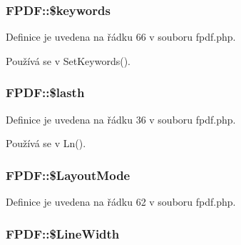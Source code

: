 \hypertarget{class_f_p_d_f_af911783b120fbaaebdad50473826a43a}{
\subsubsection[{\$keywords}]{\setlength{\rightskip}{0pt plus 5cm}F\-P\-D\-F\-::\$keywords}}\label{class_f_p_d_f_af911783b120fbaaebdad50473826a43a}


Definice je uvedena na řádku 66 v souboru fpdf.\-php.



Používá se v Set\-Keywords().

\hypertarget{class_f_p_d_f_a95a0a41b723b698af4b1e4a08e443388}{
\subsubsection[{\$lasth}]{\setlength{\rightskip}{0pt plus 5cm}F\-P\-D\-F\-::\$lasth}}\label{class_f_p_d_f_a95a0a41b723b698af4b1e4a08e443388}


Definice je uvedena na řádku 36 v souboru fpdf.\-php.



Používá se v Ln().

\hypertarget{class_f_p_d_f_a8a1b8f011e83924e04fd4868e6a0fd25}{
\subsubsection[{\$\-Layout\-Mode}]{\setlength{\rightskip}{0pt plus 5cm}F\-P\-D\-F\-::\$\-Layout\-Mode}}\label{class_f_p_d_f_a8a1b8f011e83924e04fd4868e6a0fd25}


Definice je uvedena na řádku 62 v souboru fpdf.\-php.

\hypertarget{class_f_p_d_f_a563f4dec18a06abc382f2e31fe456fe8}{
\subsubsection[{\$\-Line\-Width}]{\setlength{\rightskip}{0pt plus 5cm}F\-P\-D\-F\-::\$\-Line\-Width}}\label{class_f_p_d_f_a563f4dec18a06abc382f2e31fe456fe8}


